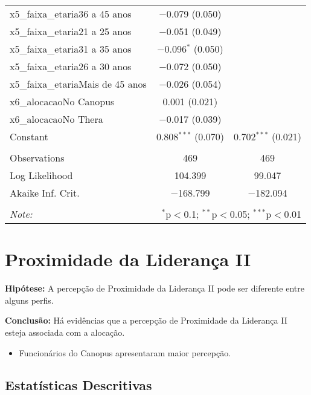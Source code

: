 \documentclass[]{book}
\providecommand{\tightlist}{%
  \setlength{\itemsep}{0pt}\setlength{\parskip}{0pt}}
\begin{document}
\begin{table}[!htbp]
\begin{tabular}{@{\extracolsep{5pt}}lcc}
  x5\_faixa\_etaria36 a 45 anos & $-$0.079 (0.050) &  \\ 
  x5\_faixa\_etaria21 a 25 anos & $-$0.051 (0.049) &  \\ 
  x5\_faixa\_etaria31 a 35 anos & $-$0.096$^{*}$ (0.050) &  \\ 
  x5\_faixa\_etaria26 a 30 anos & $-$0.072 (0.050) &  \\ 
  x5\_faixa\_etariaMais de 45 anos & $-$0.026 (0.054) &  \\ 
  x6\_alocacaoNo Canopus & 0.001 (0.021) &  \\ 
  x6\_alocacaoNo Thera & $-$0.017 (0.039) &  \\ 
  Constant & 0.808$^{***}$ (0.070) & 0.702$^{***}$ (0.021) \\ 
 \hline \\[-1.8ex] 
Observations & 469 & 469 \\ 
Log Likelihood & 104.399 & 99.047 \\ 
Akaike Inf. Crit. & $-$168.799 & $-$182.094 \\ 
\hline 
\hline \\[-1.8ex] 
\textit{Note:}  & \multicolumn{2}{r}{$^{*}$p$<$0.1; $^{**}$p$<$0.05; $^{***}$p$<$0.01} \\ 
\end{tabular} 
\end{table}

\pagebreak

\hypertarget{proximidade-da-lideranca-ii}{%
\section{Proximidade da Liderança II}\label{proximidade-da-lideranca-ii}}

\textbf{Hipótese:} A percepção de Proximidade da Liderança II pode ser diferente entre alguns perfis.

\textbf{Conclusão:} Há evidências que a percepção de Proximidade da Liderança II esteja associada com a alocação.

\begin{itemize}
\tightlist
\item
  Funcionários do Canopus apresentaram maior percepção.
\end{itemize}

\hypertarget{estatisticas-descritivas-8}{%
\subsection{Estatísticas Descritivas}\label{estatisticas-descritivas-8}}
\end{document}
